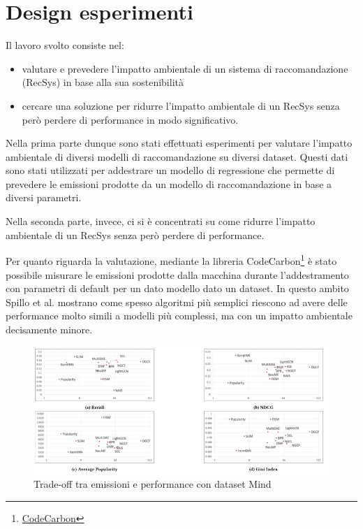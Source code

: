 \section{Design esperimenti}



\noindent Il lavoro svolto consiste nel: 
\begin{itemize}
    \item valutare e prevedere l'impatto ambientale di un sistema di raccomandazione (RecSys) in base alla sua sostenibilità
    \item cercare una soluzione per ridurre l'impatto ambientale di un RecSys senza però perdere di performance in modo significativo.
\end{itemize}

\noindent Nella prima parte dunque sono stati effettuati esperimenti per valutare l'impatto ambientale di diversi modelli di raccomandazione su diversi dataset. Questi dati sono stati utilizzati per addestrare un modello di regressione che permette di prevedere le emissioni prodotte da un modello di raccomandazione in base a diversi parametri.


\noindent Nella seconda parte, invece, ci si è concentrati su come ridurre l'impatto ambientale di un RecSys senza però perdere di performance.



\noindent Per quanto riguarda la valutazione, mediante la libreria CodeCarbon\footnote{\href{http://codecarbon.io}{CodeCarbon}}{} è stato possibile misurare le emissioni prodotte dalla macchina durante l'addestramento con parametri di default per un dato modello dato un dataset. 
In questo ambito  Spillo et al.\cite{spillo2023towards} mostrano come spesso algoritmi più semplici riescono ad avere delle performance molto simili a modelli più complessi, ma con un impatto ambientale decisamente minore.

\begin{figure}[H]
    \centering
    \includegraphics[width=\textwidth]{images/risultati-valutazione.png}
    \caption{Trade-off tra emissioni e performance con dataset Mind}


\end{figure}
\newpage





